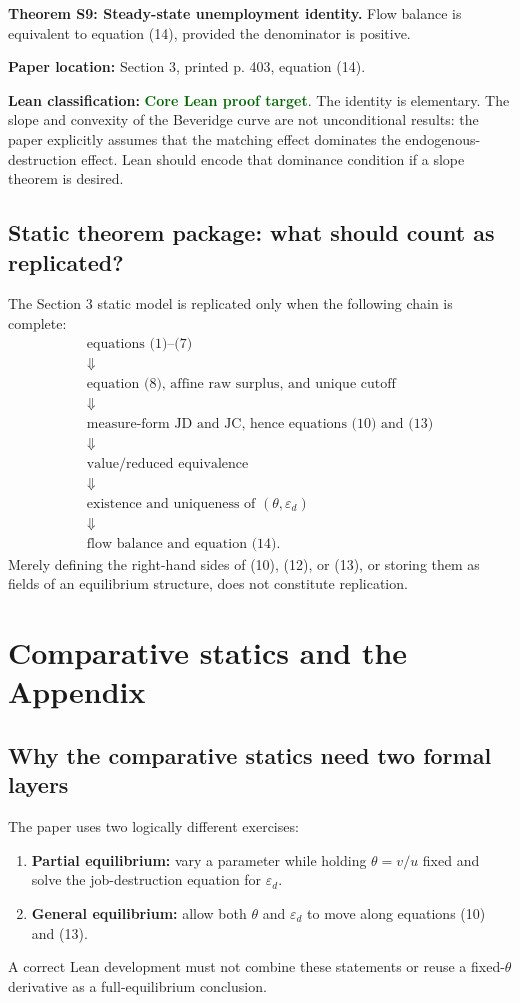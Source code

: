 \documentclass[11pt]{article}
\newcommand{\epsd}{\varepsilon_d}
\newcommand{\paperloc}[1]{\textbf{Paper location:} #1}
\newcommand{\leanclass}[1]{\textbf{Lean classification:} #1}
\newcommand{\core}{\textcolor{darkGreen}{\textbf{Core Lean proof target}}}
\newcommand{\resultname}[1]{\medskip\noindent\textbf{#1.}}
\begin{document}
\resultname{Theorem S9: Steady-state unemployment identity}
Flow balance is equivalent to equation (14), provided the denominator is positive.

\paperloc{Section 3, printed p. 403, equation (14).}

\leanclass{\core.}
The identity is elementary. The slope and convexity of the Beveridge curve are not unconditional results: the paper explicitly assumes that the matching effect dominates the endogenous-destruction effect. Lean should encode that dominance condition if a slope theorem is desired.

\subsection{Static theorem package: what should count as replicated?}

The Section 3 static model is replicated only when the following chain is complete:
\[
\begin{array}{c}
\text{equations (1)--(7)}\\
\Downarrow\\
\text{equation (8), affine raw surplus, and unique cutoff}\\
\Downarrow\\
\text{measure-form JD and JC, hence equations (10) and (13)}\\
\Downarrow\\
\text{value/reduced equivalence}\\
\Downarrow\\
\text{existence and uniqueness of }(\theta,\epsd)\\
\Downarrow\\
\text{flow balance and equation (14).}
\end{array}
\]
Merely defining the right-hand sides of (10), (12), or (13), or storing them as fields of an equilibrium structure, does not constitute replication.

\newpage
\section{Comparative statics and the Appendix}

\subsection{Why the comparative statics need two formal layers}

The paper uses two logically different exercises:
\begin{enumerate}
\item \textbf{Partial equilibrium:} vary a parameter while holding $\theta=v/u$ fixed and solve the job-destruction equation for $\epsd$.
\item \textbf{General equilibrium:} allow both $\theta$ and $\epsd$ to move along equations (10) and (13).
\end{enumerate}
A correct Lean development must not combine these statements or reuse a fixed-$\theta$ derivative as a full-equilibrium conclusion.
\end{document}

